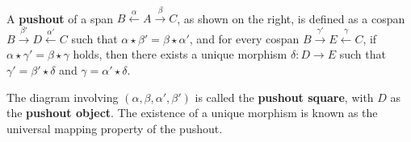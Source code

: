 \begin{definition}
    \label{def:cat:po}
    \ \newline
\noindent
\begin{minipage}{0.7\textwidth}  
    A \textbf{pushout} of a span \( B \overset{\alpha}{\leftarrow} A \overset{\beta}{\rightarrow} C \), as shown on the right, is defined as a cospan \( B \overset{\beta'}{\rightarrow} D \overset{\alpha'}{\leftarrow} C \) such that \( \alpha \mathop{\star} \beta' \mathop{=} \beta \mathop{\star} \alpha' \), and for every cospan \( B \overset{\gamma'}{\rightarrow} E \overset{\gamma}{\leftarrow} C \), if \( \alpha \mathop{\star} \gamma' \mathop{=} \beta \mathop{\star} \gamma \) holds, then there exists a unique morphism \(\delta : D \mathop{\to} E\) such that \( \gamma' \mathop{=} \beta' \mathop{\star} \delta \) and \( \gamma \mathop{=} \alpha' \mathop{\star} \delta \).
\end{minipage}
\hfill
\begin{minipage}{0.299\textwidth}
    \hfill
{}
\end{minipage}
The diagram involving \( (\alpha, \beta, \alpha', \beta') \) is called the \textbf{pushout square}, with \(D\) as the \textbf{pushout object}. The existence of a unique morphism is known as the universal mapping property of the pushout.
\end{definition} 

